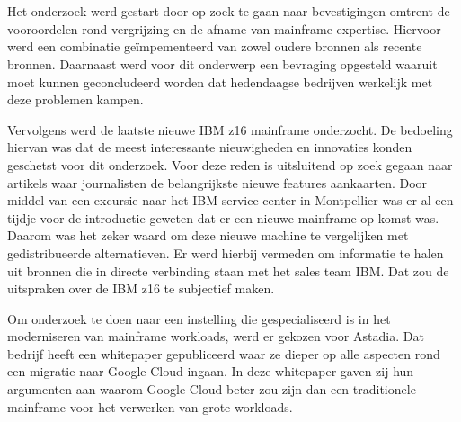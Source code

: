 
\chapter{}
\label{ch:methodologie}



\section{}
\label{sec:De literatuur- en vergelijkende studie}

Het onderzoek werd gestart door op zoek te gaan naar bevestigingen omtrent de vooroordelen rond vergrijzing en de afname van mainframe-expertise. Hiervoor werd een combinatie geïmpementeerd van zowel oudere bronnen als recente bronnen. Daarnaast werd voor dit onderwerp een bevraging opgesteld waaruit moet kunnen geconcludeerd worden dat hedendaagse bedrijven werkelijk met deze problemen kampen. 

Vervolgens werd de laatste nieuwe IBM z16 mainframe onderzocht. De bedoeling hiervan was dat de meest interessante nieuwigheden en innovaties konden geschetst voor dit onderzoek. Voor deze reden is uitsluitend op zoek gegaan naar artikels waar journalisten de belangrijkste nieuwe features aankaarten. Door middel van een excursie naar het IBM service center in Montpellier was er al een tijdje voor de introductie geweten dat er een nieuwe mainframe op komst was. Daarom was het zeker waard om deze nieuwe machine te vergelijken met gedistribueerde alternatieven. Er werd hierbij vermeden om informatie te halen uit bronnen die in directe verbinding staan met het sales team IBM. Dat zou de uitspraken over de IBM z16 te subjectief maken. 

Om onderzoek te doen naar een instelling die gespecialiseerd is in het moderniseren van mainframe workloads, werd er gekozen voor Astadia. Dat bedrijf heeft een whitepaper gepubliceerd waar ze dieper op alle aspecten rond een migratie naar Google Cloud ingaan. In deze whitepaper gaven zij hun argumenten aan waarom Google Cloud beter zou zijn dan een traditionele mainframe voor het verwerken van grote workloads. 


